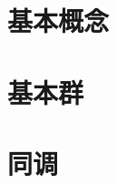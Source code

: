\documentclass{ctexbook}
\begin{document}
	\chapter{基本概念}
		
	\chapter{基本群}
		
	\chapter{同调}
		
\end{document}
